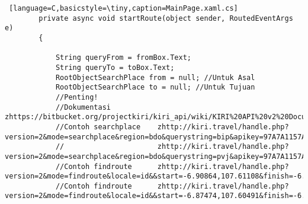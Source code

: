 \begin{lstlisting} [language=C,basicstyle=\tiny,caption=MainPage.xaml.cs]
        private async void startRoute(object sender, RoutedEventArgs e)
        {
            
            String queryFrom = fromBox.Text;
            String queryTo = toBox.Text;
            RootObjectSearchPlace from = null; //Untuk Asal
            RootObjectSearchPlace to = null; //Untuk Tujuan
            //Penting!
            //Dokumentasi zhttps://bitbucket.org/projectkiri/kiri_api/wiki/KIRI%20API%20v2%20Documentation
            //Contoh searchplace    zhttp://kiri.travel/handle.php?version=2&mode=searchplace&region=bdo&querystring=bip&apikey=97A7A1157A05ED6F
            //                      zhttp://kiri.travel/handle.php?version=2&mode=searchplace&region=bdo&querystring=pvj&apikey=97A7A1157A05ED6F
            //Contoh findroute      zhttp://kiri.travel/handle.php?version=2&mode=findroute&locale=id&&start=-6.90864,107.61108&finish=-6.88929,107.59574&presentation=mobile&apikey=97A7A1157A05ED6F
            //Contoh findroute      zhttp://kiri.travel/handle.php?version=2&mode=findroute&locale=id&&start=-6.87474,107.60491&finish=-6.88909,107.59614&presentation=mobile&apikey=97A7A1157A05ED6F    


\end{lstlisting}
